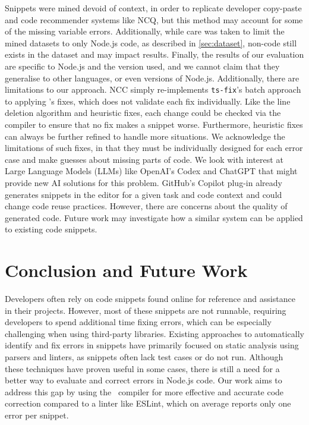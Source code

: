 \documentclass[conference]{IEEEtran}
\begin{document}
Snippets were mined devoid of context, in order to replicate developer copy-paste and code recommender systems like NCQ, but this method may account for some of the missing variable errors. Additionally, while care was taken to limit the mined datasets to only Node.js code, as described in \autoref{sec:dataset}, non-code still exists in the dataset and may impact results. Finally, the results of our evaluation are specific to Node.js and the version used, and we cannot claim that they generalise to other languages, or even versions of Node.js. Additionally, there are limitations to our approach. NCC simply re-implements \texttt{ts-fix}'s batch approach to applying \ts{}'s fixes, which does not validate each fix individually. Like the line deletion algorithm and heuristic fixes, each change could be checked via the compiler to ensure that no fix makes a snippet worse. Furthermore, heuristic fixes can always be further refined to handle more situations. We acknowledge the limitations of such fixes, in that they must be individually designed for each error case and make guesses about missing parts of code. We look with interest at Large Language Models (LLMs) like OpenAI's Codex and ChatGPT that might provide new AI solutions for this problem. GitHub's Copilot plug-in already generates snippets in the editor for a given task and code context and could change code reuse practices. However, there are concerns about the quality of generated code. Future work may investigate how a similar system can be applied to existing code snippets.

\section{Conclusion and Future Work}
\label{sec:conclusion}

Developers often rely on code snippets found online for reference and assistance in their projects. However, most of these snippets are not runnable, requiring developers to spend additional time fixing errors, which can be especially challenging when using third-party libraries. Existing approaches to automatically identify and fix errors in snippets have primarily focused on static analysis using parsers and linters, as snippets often lack test cases or do not run. Although these techniques have proven useful in some cases, there is still a need for a better way to evaluate and correct errors in Node.js code. Our work aims to address this gap by using the \ts\ compiler for more effective and accurate code correction compared to a linter like ESLint, which on average reports only one error per snippet. 
\end{document}
